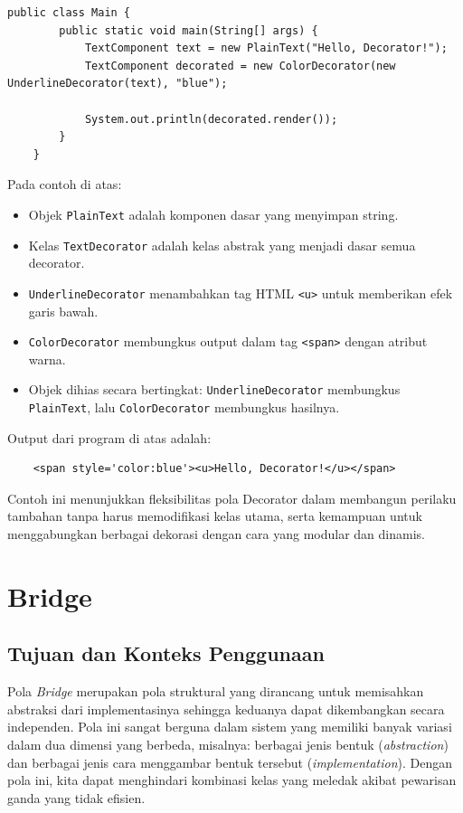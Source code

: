 \begin{lstlisting}[style=JavaStyle, caption={Client: Penggunaan Decorator}, label={lst:decorator-main}]
	public class Main {
		public static void main(String[] args) {
			TextComponent text = new PlainText("Hello, Decorator!");
			TextComponent decorated = new ColorDecorator(new UnderlineDecorator(text), "blue");
			
			System.out.println(decorated.render());
		}
	}
\end{lstlisting}

Pada contoh di atas:
\begin{itemize}
	\item Objek \texttt{PlainText} adalah komponen dasar yang menyimpan string.
	\item Kelas \texttt{TextDecorator} adalah kelas abstrak yang menjadi dasar semua decorator.
	\item \texttt{UnderlineDecorator} menambahkan tag HTML \texttt{<u>} untuk memberikan efek garis bawah.
	\item \texttt{ColorDecorator} membungkus output dalam tag \texttt{<span>} dengan atribut warna.
	\item Objek dihias secara bertingkat: \texttt{UnderlineDecorator} membungkus \texttt{PlainText}, lalu \texttt{ColorDecorator} membungkus hasilnya.
\end{itemize}

Output dari program di atas adalah:
\begin{verbatim}
	<span style='color:blue'><u>Hello, Decorator!</u></span>
\end{verbatim}

Contoh ini menunjukkan fleksibilitas pola Decorator dalam membangun perilaku tambahan tanpa harus memodifikasi kelas utama, serta kemampuan untuk menggabungkan berbagai dekorasi dengan cara yang modular dan dinamis.



\section{Bridge}

\subsection{Tujuan dan Konteks Penggunaan}

Pola \textit{Bridge} merupakan pola struktural yang dirancang untuk memisahkan abstraksi dari implementasinya sehingga keduanya dapat dikembangkan secara independen. Pola ini sangat berguna dalam sistem yang memiliki banyak variasi dalam dua dimensi yang berbeda, misalnya: berbagai jenis bentuk (\textit{abstraction}) dan berbagai jenis cara menggambar bentuk tersebut (\textit{implementation}). Dengan pola ini, kita dapat menghindari kombinasi kelas yang meledak akibat pewarisan ganda yang tidak efisien.

